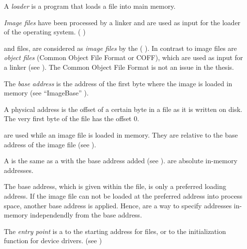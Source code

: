 \begin{definition}[loader]
A \emph{loader} is a program that loads a file into main memory.
\end{definition} 

\begin{definition}
\emph{Image files} have been processed by a linker and are used as input for the loader of the operating system. (\cf{} \cite[]{pespec})
\end{definition} 

\EXE{} and \DLL{} files, are considered as \emph{image files} by the \PECOFF{} (\cf{} \cite[]{pespec}).
In contrast to image files are \emph{object files} (Common Object File Format or {COFF}), which are used as input for a linker (see \cite[]{pespec}). The Common Object File Format is not an issue in the thesis.

\begin{definition}
The \emph{base address} is the address of the first byte where the image is loaded in memory (see \enquote{ImageBase} \cite[]{pespec}).
\end{definition} 

\begin{definition}
A physical address is the offset of a certain byte in a file as it is written on disk. The very first byte of the file has the offset 0.
\end{definition} 

\begin{definition}[RVA]
\emph{} are used while an image file is loaded in memory. They are relative to the base address of the image file (see \cite[]{pespec}).
\end{definition} 

\begin{definition}[VA]
A \emph{\VA{}} is the same as a \RVA{} with the base address added (see \cite[]{pespec}).  are absolute in-memory addresses.
\end{definition} 

The base address, which is given within the \PE{} file, is only a preferred loading address. If the image file can not be loaded at the preferred address into process space, another base address is applied. Hence,  are a way to specify addresses in-memory independendly from the base address. 

\begin{definition}\label{def:entrypoint} 
The \emph{entry point} is a \RVA{} to the starting address for \EXE{} files, or to the initialization function for device drivers. (see \cite[]{pespec}) 
\end{definition}

